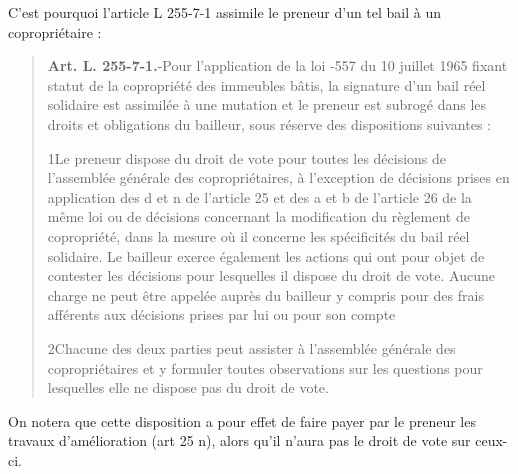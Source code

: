 		C'est pourquoi l’article L 255-7-1 assimile le preneur d’un tel bail à un copropriétaire :
		\begin{quote}
			\textbf{Art. L. 255-7-1.}-Pour l'application de la loi -557 du 10 juillet 1965 fixant statut de la copropriété des immeubles bâtis, la signature d'un bail réel solidaire est assimilée à une mutation et le preneur est subrogé dans les droits et obligations du bailleur, sous réserve des dispositions suivantes :
			
			1\degres Le preneur dispose du droit de vote pour toutes les décisions de l'assemblée générale des copropriétaires, à l'exception de décisions prises en application des d et n de l'article 25 et des a et b de l'article 26 de la même loi ou de décisions concernant la modification du règlement de copropriété, dans la mesure où il concerne les spécificités du bail réel solidaire. Le bailleur exerce également les actions qui ont pour objet de contester les décisions pour lesquelles il dispose du droit de vote. Aucune charge ne peut être appelée auprès du bailleur y compris pour des frais afférents aux décisions prises par lui ou pour son compte
			
			2\degres Chacune des deux parties peut assister à l'assemblée générale des copropriétaires et y formuler toutes observations sur les questions pour lesquelles elle ne dispose pas du droit de vote.
		\end{quote}
		On notera que cette disposition a pour effet de faire payer par le preneur les travaux d’amélioration (art 25 n), alors qu’il n’aura pas le droit de vote sur ceux-ci.